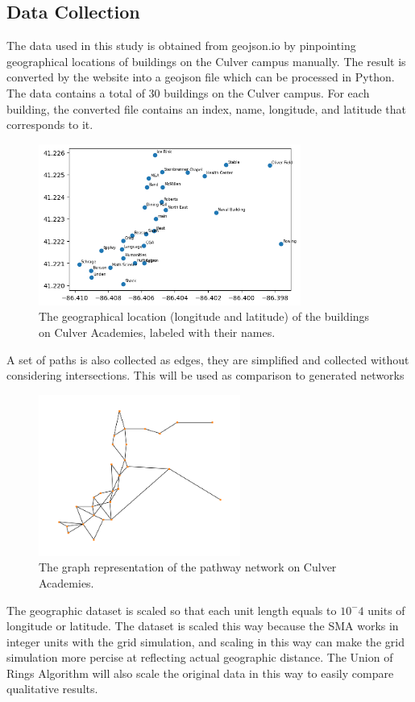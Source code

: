 \documentclass[11pt]{article}
\begin{document}
\subsection{Data Collection}
The data used in this study is obtained from geojson.io by pinpointing geographical locations of buildings on the Culver campus manually. The result is converted by the website into a geojson file which can be processed in Python. The data contains a total of 30 buildings on the Culver campus. For each building, the converted file contains an index, name, longitude, and latitude that corresponds to it. \par
\begin{figure}[H]
\centering
\includegraphics[height=200px]{campuslayout.png}
\caption{The geographical location (longitude and latitude) of the buildings on Culver Academies, labeled with their names.}
\end{figure} 
A set of paths is also collected as edges, they are simplified and collected without considering intersections. This will be used as comparison to generated networks \par
\begin{figure}[H]
\centering
\includegraphics[height=200px]{original.png}
\caption{The graph representation of the pathway network on Culver Academies.}
\end{figure} \par
The geographic dataset is scaled so that each unit length equals to $10^-4$ units of longitude or latitude. The dataset is scaled this way because the SMA works in integer units with the grid simulation, and scaling in this way can make the grid simulation more percise at reflecting actual geographic distance. The Union of Rings Algorithm will also scale the original data in this way to easily compare qualitative results. \par
\end{document}
